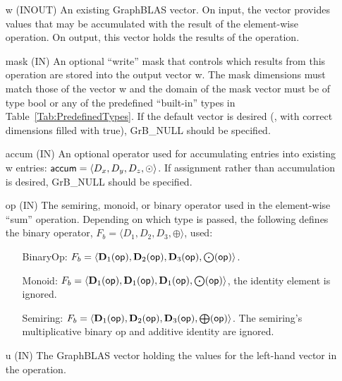 \begin{itemize}[leftmargin=1.1in]
    \item[{\sf w}]    ({\sf INOUT}) An existing GraphBLAS vector.  On input,
    the vector provides values that may be accumulated with the result of the
    element-wise operation.  On output, this vector holds the results of the
    operation.

    \item[{\sf mask}] ({\sf IN}) An optional ``write'' mask that controls which
    results from this operation are stored into the output vector {\sf w}. The 
    mask dimensions must match those of the vector {\sf w} and the domain of the
    {\sf mask} vector must be of type {\sf bool} or any of the predefined 
    ``built-in'' types in Table~\ref{Tab:PredefinedTypes}.  If the default vector
    is desired (\ie, with correct dimensions filled with {\sf true}), 
    {\sf GrB\_NULL} should be specified.

    \item[{\sf accum}] ({\sf IN}) An optional operator used for accumulating
    entries into existing {\sf w} entries: ${\sf accum} = \langle D_x,
    D_y, D_z,\odot \rangle$. If assignment rather than accumulation is
    desired, {\sf GrB\_NULL} should be specified.

    \item[{\sf op}]    ({\sf IN}) The semiring, monoid, or binary operator 
    used in the element-wise ``sum'' operation.  Depending on which type is
    passed, the following defines the binary operator, 
    $F_b=\langle D_1,D_2,D_3,\oplus\rangle$, used:
    \begin{itemize}[leftmargin=1.1in]
    \item[BinaryOp:] $F_b = \langle \bold{D}_1({\sf op}), \bold{D}_2({\sf op}),
    \bold{D}_3({\sf op}),\bold{\bigodot}({\sf op})\rangle$.  
    \item[Monoid:] $F_b = \langle \bold{D}_1({\sf op}), \bold{D}_1({\sf op}),
    \bold{D}_1({\sf op}),\bold{\bigodot}({\sf op})\rangle$,
    the identity element is ignored. 
    \item[Semiring:] $F_b = \langle \bold{D}_1({\sf op}), \bold{D}_2({\sf op}),
    \bold{D}_3({\sf op}),\bold{\bigoplus}({\sf op})\rangle$.  The semiring's 
    multiplicative binary op and additive identity are ignored.
    \end{itemize}
    
    \item[{\sf u}]     ({\sf IN}) The GraphBLAS vector holding the values for
    the left-hand vector in the operation.
    

\end{itemize}
